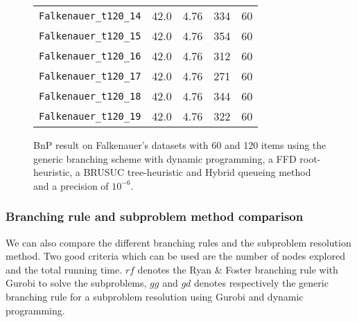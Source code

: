 \begin{figure}[!ht]
{\begin{minipage}{0.47\linewidth}
\begin{tabular}{|ccccc|}
			\texttt{Falkenauer\_t120\_14} & 42.0           & 4.76 & 334             & 60      \\
			\texttt{Falkenauer\_t120\_15} & 42.0           & 4.76 & 354             & 60      \\
			\texttt{Falkenauer\_t120\_16} & 42.0           & 4.76 & 312             & 60      \\
			\texttt{Falkenauer\_t120\_17} & 42.0           & 4.76 & 271             & 60      \\
			\texttt{Falkenauer\_t120\_18} & 42.0           & 4.76 & 344             & 60     \\
			\texttt{Falkenauer\_t120\_19} & 42.0           & 4.76 & 322             & 60      \\
			\hline
		\end{tabular}
	\end{minipage}
	}
	\caption{BnP result on Falkenauer's datasets with 60 and 120 items using the generic branching scheme with dynamic programming, a FFD root-heuristic, a BRUSUC tree-heuristic and Hybrid queueing method and a precision of $10^{-6}$.}
\end{figure}

\subsubsection{Branching rule and subproblem method comparison}

We can also compare the different branching rules and the subproblem resolution method. Two good criteria which can be used are the number of nodes explored and the total running time. $rf$ denotes the Ryan \& Foster branching rule with Gurobi to solve the subproblems, $gg$ and $gd$ denotes respectively the generic branching rule for a subproblem resolution using Gurobi and dynamic programming. 

